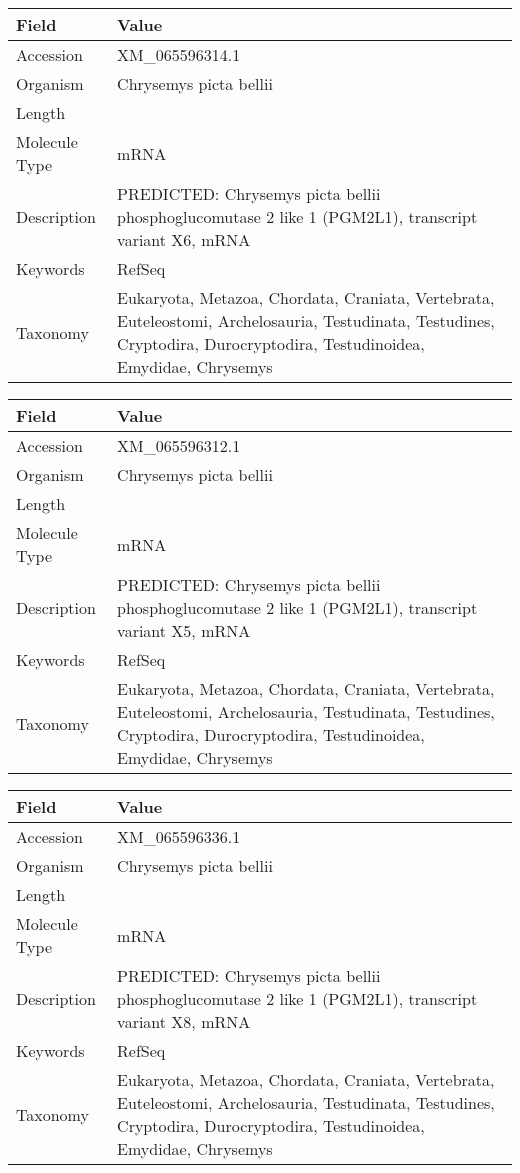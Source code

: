 \documentclass[10pt]{article}
\begin{document}
\vspace{1em}
{\footnotesize
\begin{longtable}{>{\raggedright\arraybackslash}p{4.5cm} >{\raggedright\arraybackslash}p{11.5cm}}
\textbf{Field} & \textbf{Value} \\
\hline
Accession & XM\_065596314.1 \\
Organism & Chrysemys picta bellii \\
Length & 7945 \\
Molecule Type & mRNA \\
Description & PREDICTED: Chrysemys picta bellii phosphoglucomutase 2 like 1 (PGM2L1), transcript variant X6, mRNA \\
Keywords & RefSeq \\
Taxonomy & Eukaryota, Metazoa, Chordata, Craniata, Vertebrata, Euteleostomi, Archelosauria, Testudinata, Testudines, Cryptodira, Durocryptodira, Testudinoidea, Emydidae, Chrysemys \\
\end{longtable}
}

\vspace{1em}
{\footnotesize
\begin{longtable}{>{\raggedright\arraybackslash}p{4.5cm} >{\raggedright\arraybackslash}p{11.5cm}}
\textbf{Field} & \textbf{Value} \\
\hline
Accession & XM\_065596312.1 \\
Organism & Chrysemys picta bellii \\
Length & 13405 \\
Molecule Type & mRNA \\
Description & PREDICTED: Chrysemys picta bellii phosphoglucomutase 2 like 1 (PGM2L1), transcript variant X5, mRNA \\
Keywords & RefSeq \\
Taxonomy & Eukaryota, Metazoa, Chordata, Craniata, Vertebrata, Euteleostomi, Archelosauria, Testudinata, Testudines, Cryptodira, Durocryptodira, Testudinoidea, Emydidae, Chrysemys \\
\end{longtable}
}

\vspace{1em}
{\footnotesize
\begin{longtable}{>{\raggedright\arraybackslash}p{4.5cm} >{\raggedright\arraybackslash}p{11.5cm}}
\textbf{Field} & \textbf{Value} \\
\hline
Accession & XM\_065596336.1 \\
Organism & Chrysemys picta bellii \\
Length & 7502 \\
Molecule Type & mRNA \\
Description & PREDICTED: Chrysemys picta bellii phosphoglucomutase 2 like 1 (PGM2L1), transcript variant X8, mRNA \\
Keywords & RefSeq \\
Taxonomy & Eukaryota, Metazoa, Chordata, Craniata, Vertebrata, Euteleostomi, Archelosauria, Testudinata, Testudines, Cryptodira, Durocryptodira, Testudinoidea, Emydidae, Chrysemys \\
\end{longtable}
}
\end{document}
